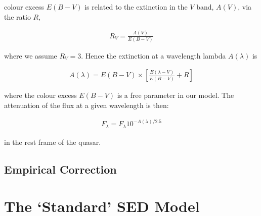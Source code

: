 colour excess $E(B-V)$ is related to the extinction in the $V$ band, $A(V)$, via the ratio  $R$, 

\begin{eqnarray}
  R_V = \frac{A(V)}{E(B-V)}
\end{eqnarray}

where we assume $R_V = 3$. 
Hence the extinction at a wavelength lambda $A(\lambda)$ is 

\begin{eqnarray}
  A(\lambda) = E(B-V) \times \left[ \frac{E(\lambda-V)}{E(B-V)} + R \right] 
\end{eqnarray}

where the colour excess $E(B-V)$ is a free parameter in our model. 
The attenuation of the flux at a given wavelength is then:

\begin{eqnarray}
  F_\lambda = F_\lambda10^{-A(\lambda)/2.5}
\end{eqnarray}

in the rest frame of the quasar. 

\subsection{Empirical Correction}


\section{The `Standard' SED Model} 


